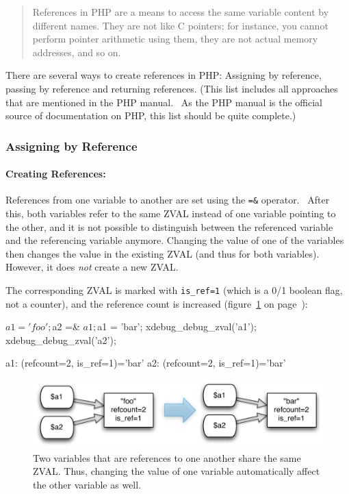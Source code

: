 \begin{quote}
References in PHP are a means to access the same variable content by different names. They are not like C pointers; for instance, you cannot perform pointer arithmetic using them, they are not actual memory addresses, and so on.
\end{quote}

There are several ways to create references in PHP: Assigning by reference, passing by reference and returning references. (This list includes all approaches that are mentioned in the PHP manual.~\cite{php-manual-references} As the PHP manual is the official source of documentation on PHP, this list should be quite complete.)


\subsubsection{Assigning by Reference}

\paragraph{Creating References:}

References from one variable to another are set using the \texttt{=\&} operator.~\cite[page 129]{wenz-php53}\cite{php-manual-what-references-do} After this, both variables refer to the same ZVAL instead of one variable pointing to the other, and it is not possible to distinguish between the referenced variable and the referencing variable anymore. Changing the value of one of the variables then changes the value in the existing ZVAL (and thus for both variables). However, it does \emph{not} create a new ZVAL.

The corresponding ZVAL is marked with \texttt{is\_ref=1} (which is a 0/1 boolean flag, not a counter), and the reference count is increased (figure~\ref{fig:simple-reference} on page~\pageref{fig:simple-reference}):

\begin{phpcode}
$a1 = 'foo';
$a2 =& $a1;
$a1 = 'bar';
xdebug_debug_zval('a1');
xdebug_debug_zval('a2');
\end{phpcode}

\begin{textcode}
a1: (refcount=2, is_ref=1)='bar'
a2: (refcount=2, is_ref=1)='bar'
\end{textcode}

\begin{figure}[!h]
  \begin{center}
    \includegraphics[scale=0.8]{images/a1_a2}
    \caption{Two variables that are references to one another share the same ZVAL. Thus, changing the value of one variable automatically affect the other variable as well.}
    \label{fig:simple-reference}
  \end{center}
\end{figure}


